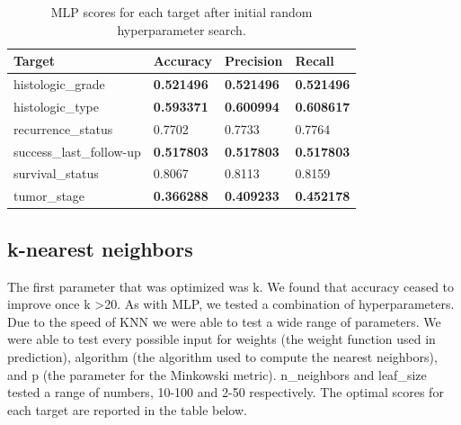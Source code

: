 \documentclass{article}
\begin{document}
\medskip
\begin{table}[H]
\begin{center}
\begin{tabular}{ *{4}{l} }
    \multicolumn{1}{p{1.5cm}}{\raggedright Target} &  
    \multicolumn{1}{p{1.5cm}}{\raggedright Accuracy} &  
    \multicolumn{1}{p{1.5cm}}{\raggedright Precision} &  
    \multicolumn{1}{p{1.5cm}}{\raggedright Recall} \\ \hline
histologic\_grade       &       \textbf{0.521496} &        \textbf{0.521496} &     \textbf{0.521496} \\
histologic\_type        &       \textbf{0.593371} &        \textbf{0.600994} &     \textbf{0.608617} \\
recurrence\_status      &         0.7702 &          0.7733 &       0.7764 \\
success\_last\_follow-up &       \textbf{0.517803} &        \textbf{0.517803} &     \textbf{0.517803} \\
survival\_status        &         0.8067 &          0.8113 &       0.8159 \\
tumor\_stage            &       \textbf{0.366288} &        \textbf{0.409233} &     \textbf{0.452178} \\
\end{tabular}
\caption{MLP scores for each target after initial random hyperparameter search.}
\end{center}
\end{table}

\subsection{k-nearest neighbors}

The first parameter that was optimized was k. We found that accuracy ceased to improve once k \textgreater  20. 
As with MLP, we tested a combination of hyperparameters. 
Due to the speed of KNN we were able to test a wide range of parameters. We were able to test every possible input for weights (the weight function used in prediction), algorithm (the algorithm used to compute the nearest neighbors), and p (the parameter for the Minkowski metric). 
n\_neighbors and leaf\_size tested a range of numbers, 10-100 and 2-50 respectively.
The optimal scores for each target are reported in the table below.
\end{document}
